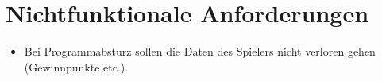 \chapter{Nichtfunktionale Anforderungen}

\begin{itemize}	
	\item Bei Programmabsturz sollen die Daten des Spielers nicht verloren gehen (Gewinnpunkte etc.).
\end{itemize}
  
